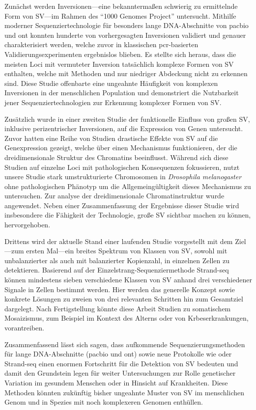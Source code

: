 Zunächst werden Inversionen---eine bekanntermaßen schwierig zu ermittelnde Form
von SV---im Rahmen des ``1000 Genomes Project'' untersucht. Mithilfe moderner
Sequenziertechnologie für besonders lange DNA\--Ab\-schnit\-te von \acl{pacbio}
und \acl{ont} konnten hunderte von vor\-her\-ge\-sag\-ten Inversionen validiert und
genauer cha\-rak\-te\-ri\-siert werden, welche zuvor in klassischen \acs{pcr}-basierten
Validierungsexperimenten ergebnislos blieben. Es stellte sich heraus, dass die
meis\-ten Loci mit vermuteter Inversion tatsächlich komplexe Formen von SV
enthalten, welche mit \mps Methoden und nur niedriger Abdeckung nicht zu
erkennen sind. Diese Studie offenbarte eine ungeahnte Häufigkeit von komplexen
Inversionen in der menschlichen Population und demonstriert die Nutzbarkeit
jener Sequenziertechnologien zur Erkennung komplexer Formen von SV.

Zusätzlich wurde in einer zweiten Studie der funktionelle Einfluss von großen SV,
inklusive perizentrischer Inversionen, auf die Expression von Genen untersucht.
Zuvor hatten eine Reihe von Studien drastische Effekte von SV auf die
Genexpression gezeigt, welche über einen Mechanismus funktionieren, der die
dreidimensionale Struktur des Chromatins beeinflusst. Während sich diese Studien
auf einzelne Loci mit pathologischen Konsequenzen fokussieren, nutzt unsere
Studie stark umstrukturierte Chromosomen in \textit{Drosophila melanogaster}
ohne pathologischen Phänotyp um die Allgemeingültigkeit dieses Mechanismus zu
untersuchen. Zur analyse der dreidimensionale Chromatinstruktur wurde \hic
angewendet. Neben einer Zusammenfassung der Ergebnisse dieser Studie wird
insbesondere die Fähigkeit der \hic Technologie, große SV sichtbar machen zu
können, hervorgehoben.

Drittens wird der aktuelle Stand einer laufenden Studie vorgestellt mit dem
Ziel---zum ersten Mal---ein breites Spektrum von Klassen von SV, sowohl mit unbalanzierter
als auch mit balanzierter Kopienzahl, in einzelnen Zellen zu detektieren.
Basierend auf der Ein\-zel\-strang-Se\-quen\-zier\-me\-tho\-de Strand-seq können
mindestens sieben verschiedene Klas\-sen von SV anhand drei verschiedener Signale
in Zellen bestimmt werden. Hier werden das generelle Konzept sowie
konkrete Lösungen zu zweien von drei relevanten Schritten hin zum Gesamtziel
dargelegt. Nach Fertigstellung könnte diese Arbeit Studien zu somatischem
Mosaizismus, zum Beispiel im Kontext des Alterns oder von Krbeserkrankungen,
vorantreiben.

Zusammenfassend lässt sich sagen, dass aufkommende Sequenzierungsmethoden für
lange DNA-Ab\-schnit\-te (\acl{pacbio} und \acl{ont}) sowie neue Protokolle wie
\hic oder Strand-seq einen enormen Fortschritt für die Detektion von SV bedeuten
und damit den Grundstein legen für weiter Untersuchungen zur Rolle genetischer
Variation im gesundem Menschen oder in Hinsicht auf Krankheiten.  Diese Methoden könnten
zukünftig bisher ungeahnte Muster von SV im menschlichen Genom und in Spezies
mit noch komplexeren Genomen enthüllen.

